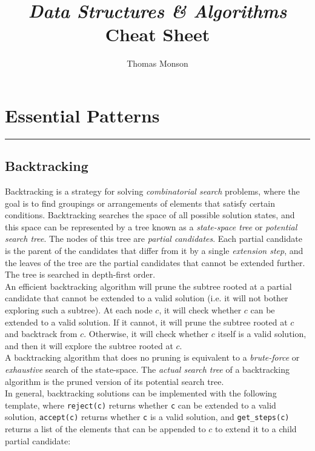 \documentclass[12pt, titlepage]{article}
\title{\textit{Data Structures \& Algorithms} Cheat Sheet}
\author{Thomas Monson}
\date{}
\begin{document}
\maketitle

\tableofcontents

\section{Essential Patterns}
\hrule\vspace{5ex}

\subsection{Backtracking}

Backtracking is a strategy for solving \textit{combinatorial search} problems, where the goal is to find groupings or arrangements of elements that satisfy certain conditions. Backtracking searches the space of all possible solution states, and this space can be represented by a tree known as a \textit{state-space tree} or \textit{potential search tree}. The nodes of this tree are \textit{partial candidates}. Each partial candidate is the parent of the candidates that differ from it by a single \textit{extension step}, and the leaves of the tree are the partial candidates that cannot be extended further. The tree is searched in depth-first order. \\

An efficient backtracking algorithm will prune the subtree rooted at a partial candidate that cannot be extended to a valid solution (i.e. it will not bother exploring such a subtree). At each node $c$, it will check whether $c$ can be extended to a valid solution. If it cannot, it will prune the subtree rooted at $c$ and backtrack from $c$. Otherwise, it will check whether $c$ itself is a valid solution, and then it will explore the subtree rooted at $c$. \\

A backtracking algorithm that does no pruning is equivalent to a \textit{brute-force} or \textit{exhaustive} search of the state-space. The \textit{actual search tree} of a backtracking algorithm is the pruned version of its potential search tree. \\

In general, backtracking solutions can be implemented with the following template, where \texttt{reject(c)} returns whether \texttt{c} can be extended to a valid solution, \texttt{accept(c)} returns whether \texttt{c} is a valid solution, and \texttt{get\_steps(c)} returns a list of the elements that can be appended to $c$ to extend it to a child partial candidate: \medskip
\end{document}
